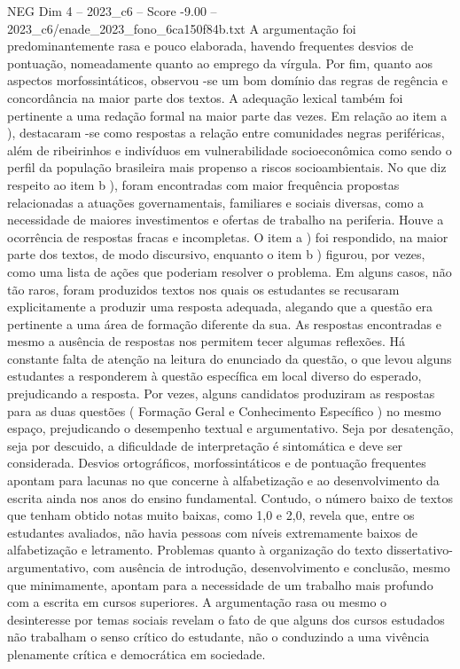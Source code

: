 \begin{textsample}{NEG Dim 4 – 2023\_c6 – Score -9.00 – 2023\_c6/enade\_2023\_fono\_6ca150f84b.txt}
A argumentação foi predominantemente rasa e pouco elaborada, havendo frequentes desvios de pontuação, nomeadamente quanto ao emprego da vírgula.
Por fim, quanto aos aspectos morfossintáticos, observou -se um bom domínio das regras de regência e concordância na maior parte dos textos.
A adequação lexical também foi pertinente a uma redação formal na maior parte das vezes.
Em relação ao item a ), destacaram -se como respostas a relação entre comunidades negras periféricas, além de ribeirinhos e indivíduos em vulnerabilidade socioeconômica como sendo o perfil da população brasileira mais propenso a riscos socioambientais.
No que diz respeito ao item b ), foram encontradas com maior frequência propostas relacionadas a atuações governamentais, familiares e sociais diversas, como a necessidade de maiores investimentos e ofertas de trabalho na periferia.
Houve a ocorrência de respostas fracas e incompletas.
O item a ) foi respondido, na maior parte dos textos, de modo discursivo, enquanto o item b ) figurou, por vezes, como uma lista de ações que poderiam resolver o problema.
Em alguns casos, não tão raros, foram produzidos textos nos quais os estudantes se recusaram explicitamente a produzir uma resposta adequada, alegando que a questão era pertinente a uma área de formação diferente da sua.
As respostas encontradas e mesmo a ausência de respostas nos permitem tecer algumas reflexões.
Há constante falta de atenção na leitura do enunciado da questão, o que levou alguns estudantes a responderem à questão específica em local diverso do esperado, prejudicando a resposta.
Por vezes, alguns candidatos produziram as respostas para as duas questões ( Formação Geral e Conhecimento Específico ) no mesmo espaço, prejudicando o desempenho textual e argumentativo.
Seja por desatenção, seja por descuido, a dificuldade de interpretação é sintomática e deve ser considerada.
Desvios ortográficos, morfossintáticos e de pontuação frequentes apontam para lacunas no que concerne à alfabetização e ao desenvolvimento da escrita ainda nos anos do ensino fundamental.
Contudo, o número baixo de textos que tenham obtido notas muito baixas, como 1,0 e 2,0, revela que, entre os estudantes avaliados, não havia pessoas com níveis extremamente baixos de alfabetização e letramento.
Problemas quanto à organização do texto dissertativo-argumentativo, com ausência de introdução, desenvolvimento e conclusão, mesmo que minimamente, apontam para a necessidade de um trabalho mais profundo com a escrita em cursos superiores.
A argumentação rasa ou mesmo o desinteresse por temas sociais revelam o fato de que alguns dos cursos estudados não trabalham o senso crítico do estudante, não o conduzindo a uma vivência plenamente crítica e democrática em sociedade.

\end{textsample}

